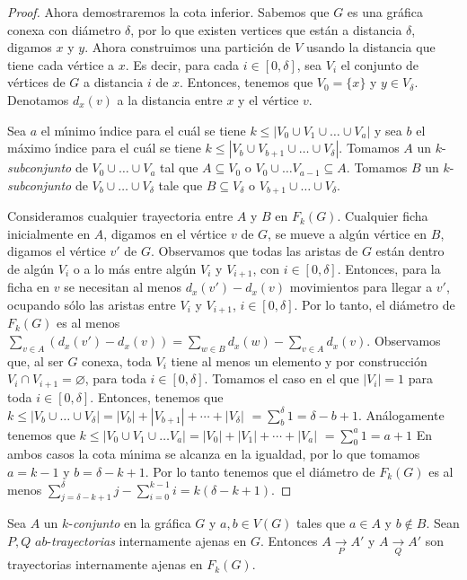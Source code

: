 \begin{proof}
Ahora demostraremos la cota inferior. Sabemos que $G$ es una gr\'afica conexa
con di\'ametro $\delta$, por lo que existen vertices que est\'an a distancia
$\delta$, digamos $x$ y $y$. Ahora construimos una partici\'on de $V$ usando  la
distancia que tiene cada v\'ertice a $x$. Es decir, para cada $i\in [0,\delta]$,
sea $V_{i}$ el conjunto de v\'ertices de $G$ a distancia $i$ de $x$. Entonces,
tenemos que $V_{0}=\{x\}$ y $y\in V_{\delta}$. Denotamos $d_x(v)$ a la distancia
entre $x$ y el v\'ertice $v$.

Sea $a$ el m\'\i{}nimo \'\i{}ndice para el cu\'al se tiene $k \leq |V_{0}\cup
V_{1}\cup \dots \cup V_{a}|$ y sea $b$ el m\'aximo \'\i{}ndice para el cu\'al se
tiene $k\leq |V_{b}\cup V_{b+1}\cup \dots \cup V_{\delta}|$. Tomamos $A$ un
$k$-\textit{subconjunto} de $V_{0}\cup \dots \cup V_{a}$  tal que $A\subseteq
V_{0}$ o $V_{0}\cup \dots V_{a-1}\subseteq A$. Tomamos $B$ un
$k$-\textit{subconjunto} de $V_{b}\cup \dots \cup V_{\delta}$ tale que
$B\subseteq V_{\delta}$ o $V_{b+1}\cup \dots \cup V_{\delta}$. 

Consideramos cualquier trayectoria entre $A$ y $B$ en $F_{k}(G)$. Cualquier
ficha inicialmente en $A$, digamos en el v\'ertice $v$ de $G$, se mueve a
alg\'un v\'ertice en $B$, digamos el v\'ertice $v'$ de $G$. Observamos que todas
las aristas de $G$ est\'an dentro de alg\'un $V_{i}$ o a lo m\'as entre alg\'un
$V_{i}$ y $V_{i+1}$, con $i\in[0,\delta]$. Entonces, para la ficha en $v$ se
necesitan al menos $d_x(v')-d_x(v)$ movimientos para llegar a $v'$, ocupando
s\'olo las aristas entre $V_{i}$ y $V_{i+1}$, $i\in [0,\delta]$. Por lo tanto,
el di\'ametro de $F_{k}(G)$ es al menos $\sum_{v\in A}(d_x(v')-d_x(v))=
\sum_{w\in B}d_x(w)-\sum_{v\in A}d_x(v)$. Observamos que, al ser $G$ conexa,
toda $V_{i}$ tiene al menos un elemento y por construcci\'on $V_{i} \cap
V_{i+1}=\varnothing$, para toda $i\in [0,\delta]$. Tomamos el caso en el que
$|V_{i}|=1$ para toda $i\in [0,\delta]$. Entonces, tenemos que $k\leq
|V_{b}\cup\dots\cup V_{\delta}|=|V_{b}|+|V_{b+1}|+\cdots +|V_\delta|$
$=\sum_{b}^{\delta}1 = \delta -b+1$. An\'alogamente tenemos que $k\leq
|V_{0}\cup V_{1}\cup \dots V_{a}|=|V_{0}|+|V_{1}|+\cdots + |V_{a}|$
$=\sum_{0}^{a} 1 = a+1$ En ambos casos la cota m\'\i{}nima se alcanza en la
igualdad, por lo que tomamos $a=k-1$ y $b=\delta-k+1$. Por lo tanto tenemos que
el di\'ametro de $F_{k}(G)$ es al menos $\sum_{j=\delta -k+1}^{\delta}j -
\sum_{i=0}^{k-1}i = k(\delta-k+1)$.
\end{proof}


\begin{lema}%
\label{lem:primero}
Sea $A$ un $k$-\textit{conjunto} en la gr\'afica $G$ y $a, b \in V(G)$ tales que
$a \in A$ y $b \notin B$. Sean $P, Q$ $ab$-\textit{trayectorias} internamente
ajenas en $G$. Entonces $A \xrightarrow[P]{} A'$ y $A \xrightarrow[Q]{} A'$ son
trayectorias internamente ajenas en $F_{k}(G)$.
\end{lema}

